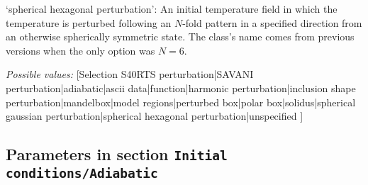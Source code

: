 \begin{itemize}
`spherical hexagonal perturbation': An initial temperature field in which the temperature is perturbed following an $N$-fold pattern in a specified direction from an otherwise spherically symmetric state. The class's name comes from previous versions when the only option was $N=6$.


{\it Possible values:} [Selection S40RTS perturbation|SAVANI perturbation|adiabatic|ascii data|function|harmonic perturbation|inclusion shape perturbation|mandelbox|model regions|perturbed box|polar box|solidus|spherical gaussian perturbation|spherical hexagonal perturbation|unspecified ]
\end{itemize}



\subsection{Parameters in section \tt Initial conditions/Adiabatic}
\label{parameters:Initial_20conditions/Adiabatic}

